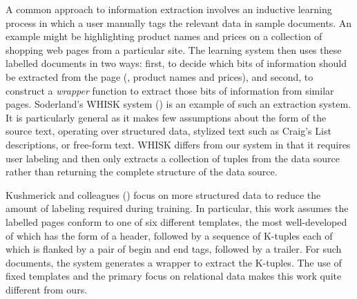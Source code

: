 A common approach to information extraction involves an inductive
learning process in which a user manually tags the relevant data in sample documents.
An example might be highlighting product names and prices on a
collection of shopping web pages from a particular site.  The learning
system then uses these labelled documents in two ways: first, to
decide which bits of information should be extracted from the page
(\ie, product names and prices), and second, to construct a
\textit{wrapper} function to extract those bits of information from
similar pages.  Soderland's WHISK system (\citeyear{soderland:whisk}) is an
example of such an extraction system.  It is particularly general as
it makes few assumptions about the form of the source text,
operating over structured data, stylized text such as Craig's List
descriptions, or free-form text.  WHISK differs from our system in
that it requires user labeling and then only extracts a collection of
tuples from the data source rather than returning the complete
structure of the data source.


Kushmerick and
colleagues (\citeyear{kushmerick-phd1997,KushmerickWD97:Wrapper}) focus on
more structured data to reduce the amount of labeling required during
training.  In particular, this work assumes the labelled pages conform
to one of six different templates, the most well-developed of which
has the form of a header, followed by a sequence of K-tuples each of
which is flanked by a pair of begin and end tags, followed by a
trailer.  For such documents, the system generates a wrapper to
extract the K-tuples.  
The use of fixed templates and the primary focus on relational data makes this
work quite different from ours.

